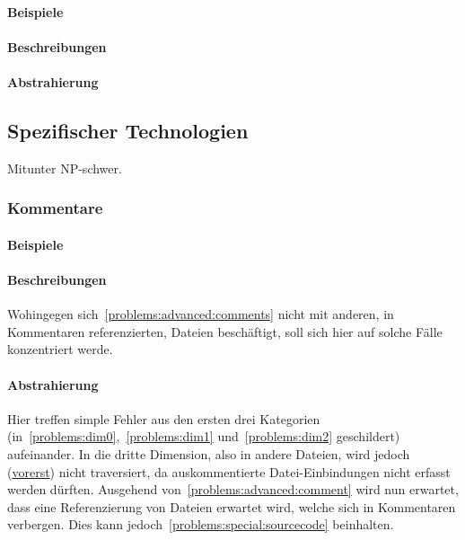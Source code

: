 \paragraph*{Beispiele}
\paragraph*{Beschreibungen}
\paragraph*{Abstrahierung}






\subsection{Spezifischer Technologien}\label{problems:special}
Mitunter NP-schwer.
\subsubsection{Kommentare}\label{problems:advanced:comments}
\paragraph*{Beispiele}
\paragraph*{Beschreibungen}
Wohingegen sich~\ref{problems:advanced:comments} nicht mit anderen, in Kommentaren referenzierten, Dateien beschäftigt, soll sich hier auf solche Fälle konzentriert werde.
\paragraph*{Abstrahierung}
Hier treffen simple Fehler aus den ersten drei Kategorien (in~\ref{problems:dim0},~\ref{problems:dim1} und~\ref{problems:dim2} geschildert) aufeinander. In die dritte Dimension, also in andere Dateien, wird jedoch (\hyperref[problems:special:comments]{vorerst}) nicht traversiert, da auskommentierte Datei-Einbindungen nicht erfasst werden dürften. 
Ausgehend von~\ref{problems:advanced:comment} wird nun erwartet, dass eine Referenzierung von Dateien erwartet wird, welche sich in Kommentaren verbergen. Dies kann jedoch~\ref{problems:special:sourcecode} beinhalten.


